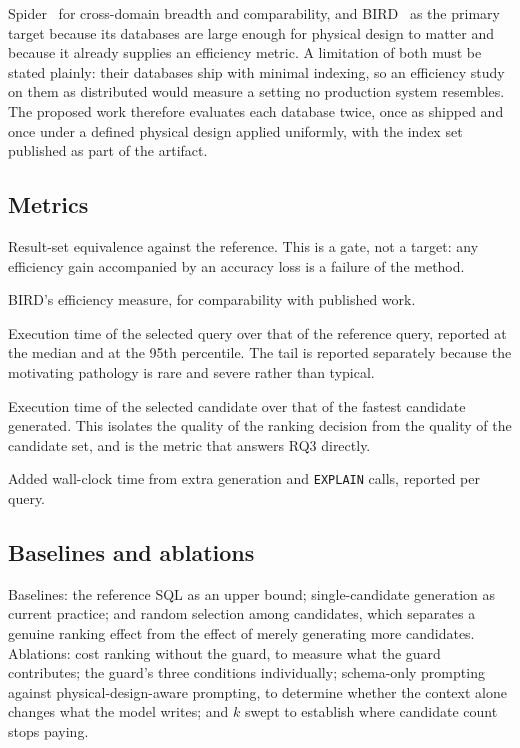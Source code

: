 \documentclass[12pt, a4paper]{article}
\begin{document}
Spider~\cite{yu2018spider} for cross-domain breadth and comparability,
and BIRD~\cite{li2023bird} as the primary target because its databases
are large enough for physical design to matter and because it already
supplies an efficiency metric. A limitation of both must be stated
plainly: their databases ship with minimal indexing, so an efficiency
study on them as distributed would measure a setting no production
system resembles. The proposed work therefore evaluates each database
twice, once as shipped and once under a defined physical design applied
uniformly, with the index set published as part of the artifact.

\subsection{Metrics}

\begin{description}[leftmargin=2.4cm, style=nextline, font=\bfseries]
\item[Execution accuracy] Result-set equivalence against the reference.
This is a gate, not a target: any efficiency gain accompanied by an
accuracy loss is a failure of the method.

\item[Valid Efficiency Score] BIRD's efficiency measure, for
comparability with published work.

\item[Median and tail latency ratio] Execution time of the selected
query over that of the reference query, reported at the median and at
the 95th percentile. The tail is reported separately because the
motivating pathology is rare and severe rather than typical.

\item[Selection regret] Execution time of the selected candidate over
that of the fastest candidate generated. This isolates the quality of
the ranking decision from the quality of the candidate set, and is the
metric that answers RQ3 directly.

\item[Overhead] Added wall-clock time from extra generation and
\texttt{EXPLAIN} calls, reported per query.
\end{description}

\subsection{Baselines and ablations}

Baselines: the reference SQL as an upper bound; single-candidate
generation as current practice; and random selection among candidates,
which separates a genuine ranking effect from the effect of merely
generating more candidates. Ablations: cost ranking without the guard,
to measure what the guard contributes; the guard's three conditions
individually; schema-only prompting against physical-design-aware
prompting, to determine whether the context alone changes what the model
writes; and $k$ swept to establish where candidate count stops paying.
\end{document}
